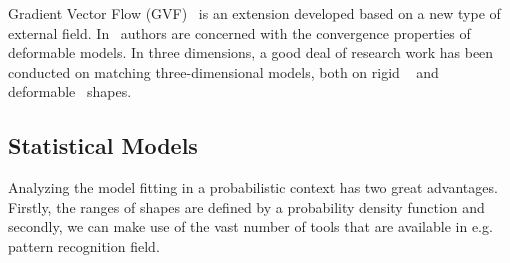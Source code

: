 \documentclass[conference]{IEEEtran}
\begin{document}
Gradient Vector Flow (GVF)~\cite{xu1998snakes} is an extension developed
based on a new type of external field. In~\cite{xu2000gradient}
authors are concerned with the convergence properties of deformable
models. In three dimensions, a good deal of research work has been
conducted on matching three-dimensional models, both on rigid
~\cite{harris1993tracking} and deformable~\cite{terzopoulos1991dynamic} shapes.
\subsection{Statistical Models}
\label{sec:sm}
Analyzing the model fitting in a probabilistic
context has two great advantages. Firstly, the ranges of shapes are defined by a
probability density function and secondly, we can make use of the vast number 
of tools that are available in e.g. pattern recognition field.
\end{document}
